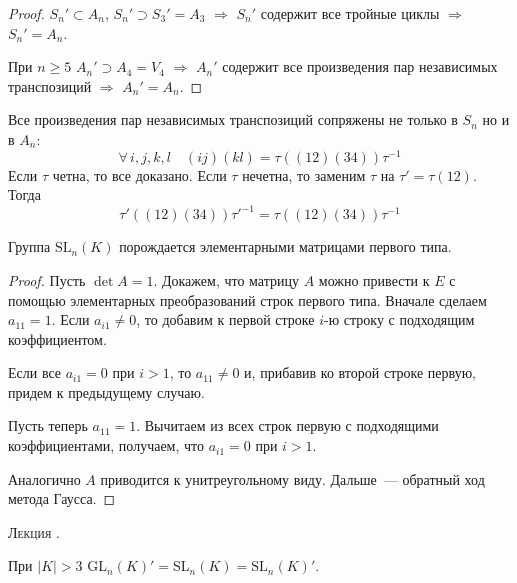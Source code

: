\documentclass[a4paper]{article}
\newcounter{lec}
\renewcommand{\thelec}{\Roman{lec}}
\newcommand*{\lecture}[1]{\refstepcounter{lec}\vspace{20pt}
\begin{center}{\rmfamily\textsc{Лекция \thelec. \\ \textbf{#1}}}\vspace{5pt}
\end{center}}
\begin{document}
\begin{proof}
$S_n'\subset A_n$, $S_n'\supset S_3'=A_3$ $\Rightarrow$ $S_n'$
содержит все тройные циклы $\Rightarrow$ $S_n'=A_n$.

При $n\geqslant 5$ $A_n'\supset A_4=V_4$ $\Rightarrow$ $A_n'$
содержит все произведения пар независимых транспозиций $\Rightarrow$
$A_n'=A_n$.
\end{proof}

\begin{note}
Все произведения пар независимых транспозиций сопряжены не только в
$S_n$ но и в $A_n$:
\begin{equation*}
  \forall \, i,j,k,l\quad
  (ij)(kl)=\tau((12)(34))\tau^{-1}
\end{equation*}
Если $\tau$ четна, то все
доказано. Если $\tau$ нечетна, то заменим $\tau$ на
$\tau'=\tau(12)$. Тогда
\begin{equation*}
  \tau'((12)(34))\tau'^{-1}=\tau((12)(34))\tau^{-1}
\end{equation*}
\end{note}

\begin{lemma}
\label{2.IX}Группа $\mathrm{SL}_n(K)$ порождается элементарными
матрицами первого типа.
\end{lemma}

\begin{proof}
Пусть $\det A=1$. Докажем, что матрицу $A$ можно привести к $E$ с
помощью элементарных преобразований строк первого типа. Вначале
сделаем $a_{11}=1$. Если $a_{i1}\neq 0$, то добавим к первой строке
$i$-ю строку с подходящим коэффициентом.

Если все $a_{i1}=0$ при $i>1$, то $a_{11}\neq 0$ и, прибавив ко
второй строке первую, придем к предыдущему случаю.

Пусть теперь $a_{11}=1$. Вычитаем из всех строк первую с подходящими
коэффициентами, получаем, что $a_{i1}=0$ при $i>1$.

Аналогично $A$ приводится к унитреугольному виду. Дальше~---
обратный ход метода Гаусса.
\end{proof}
\lecture{}

\begin{theorem}
При $|K|>3$ $\mathrm{GL}_n(K)'=\mathrm{SL}_n(K)=\mathrm{SL}_n(K)'$.
\end{theorem}
\end{document}
